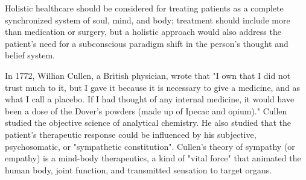 \documentclass[jpm,article,submit,moreauthors,pdftex]{Definitions/mdpi}
\begin{document}
\begin{paracol}{2}
Holistic healthcare should be considered for treating patients as a complete synchronized system of soul, mind, and body; treatment should include more than medication or surgery, but a holistic approach would also address the patient's need for a subconscious paradigm shift in the person's thought and belief system.\cite{Kobisi2012}\cite{Lipton2015}


In 1772, Willian Cullen, a British physician, wrote that  "I own that I did not trust much to it, but I gave it because it is necessary to give a medicine, and as what I call a placebo. If I had thought of any internal medicine, it would have been a dose of the Dover's powders (made up of Ipecac and opium)."\cite{Kerr2008}\cite{Finniss2018}
Cullen studied the objective science of analytical chemistry. He also studied that the patient's therapeutic response could be influenced by his
subjective, psychosomatic, or "sympathetic constitution"\cite{Kerr2008}.
Cullen's theory of sympathy (or empathy) is a mind-body therapeutics, a kind of "vital force" that animated the human body, joint function, and transmitted sensation to target organs\cite{Forget2003}\cite{Kerr2008}.

\end{paracol}
\end{document}
